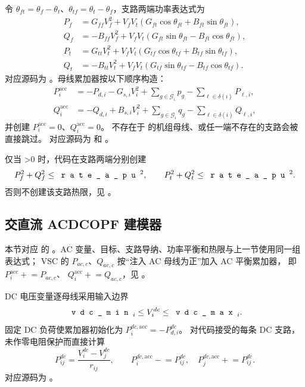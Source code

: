 令 $\theta_{ft}=\theta_f-\theta_t$、$\theta_{tf}=\theta_t-\theta_f$，支路两端功率表达式为
\begin{align}
 P_f&=G_{ff}V_f^2+V_fV_t(G_{ft}\cos\theta_{ft}+B_{ft}\sin\theta_{ft}),\\
 Q_f&=-B_{ff}V_f^2+V_fV_t(G_{ft}\sin\theta_{ft}-B_{ft}\cos\theta_{ft}),\\
 P_t&=G_{tt}V_t^2+V_fV_t(G_{tf}\cos\theta_{tf}+B_{tf}\sin\theta_{tf}),\\
 Q_t&=-B_{tt}V_t^2+V_fV_t(G_{tf}\sin\theta_{tf}-B_{tf}\cos\theta_{tf}).
\end{align}
对应源码为 。母线累加器按以下顺序构造：
\begin{align}
 P_i^{\mathrm{acc}}&=-P_{d,i}-G_{s,i}V_i^2
 +\sum_{g\in\mathcal G_i}p_g-\sum_{\ell\in\delta(i)}P_{\ell,i},\\
 Q_i^{\mathrm{acc}}&=-Q_{d,i}+B_{s,i}V_i^2
 +\sum_{g\in\mathcal G_i}q_g-\sum_{\ell\in\delta(i)}Q_{\ell,i},
\end{align}
并创建 $P_i^{\mathrm{acc}}=0$、$Q_i^{\mathrm{acc}}=0$。
不存在于  的机组母线、或任一端不存在的支路会被直接跳过。
对应源码为  和
。

仅当 >0 时，代码在支路两端分别创建
\begin{equation}
 P_f^2+Q_f^2\le \fld{rate\_a\_pu}^2,
 \qquad P_t^2+Q_t^2\le \fld{rate\_a\_pu}^2 .
\end{equation}
否则不创建该支路热限，见 。

\subsection{交直流 ACDCOPF 建模器}

本节对应  的
。AC 变量、目标、支路导纳、功率平衡和热限与上一节使用同一组表达式；
VSC 的 $P_{ac,c}$、$Q_{ac,c}$ 按“注入 AC 母线为正”加入 AC 平衡累加器，
即 $P_i^{\mathrm{acc}}\mathrel{+}=P_{ac,c}$、
$Q_i^{\mathrm{acc}}\mathrel{+}=Q_{ac,c}$，见
。

DC 电压变量逐母线采用输入边界
\begin{equation}
 \fld{vdc\_min}_i\le V_i^{dc}\le\fld{vdc\_max}_i .
\end{equation}
固定 DC 负荷使累加器初始化为 $P_i^{dc,\mathrm{acc}}=-P_{d,i}^{dc}$。
对代码接受的每条 DC 支路，未作零电阻保护而直接计算
\begin{equation}
 P_{ij}^{dc}=\frac{V_i^{dc}-V_j^{dc}}{r_{ij}},\qquad
 P_i^{dc,\mathrm{acc}}\mathrel{-}=P_{ij}^{dc},\quad
 P_j^{dc,\mathrm{acc}}\mathrel{+}=P_{ij}^{dc}.
\end{equation}
对应源码为 。

